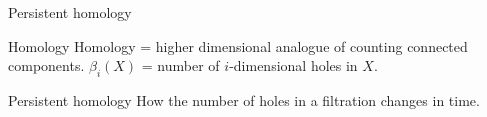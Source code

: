 \documentclass[10pt,xcolor={usenames}]{beamer}
\DeclareMathOperator{\LMST}{LMST}
\newcommand{\Ro}{\mathbb{R}}
\begin{document}
\begin{frame}{Persistent homology}

\begin{block}{Homology}
Homology = higher dimensional analogue of counting connected components. $\beta_i(X)$ = number of $i$-dimensional holes in $X$.  
\end{block}

\begin{block}{Persistent homology}
How the number of holes in a filtration changes in time.
\end{block}

\end{frame}
%
%
%
%
%
%
%
%
%
%
%
%
%
%
\end{document}
